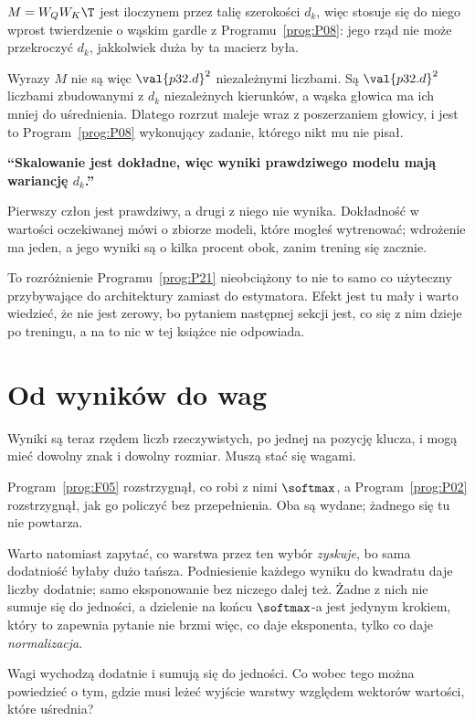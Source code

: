 \begin{fr}

$M = W_Q W_K\T$ jest iloczynem przez talię szerokości $d_k$, więc stosuje się
do niego wprost twierdzenie o wąskim gardle z Programu~\ref{prog:P08}: jego
rząd nie może przekroczyć $d_k$, jakkolwiek duża by ta macierz była.

Wyrazy $M$ nie są więc $\val{p32.d}^{2}$ niezależnymi liczbami. Są
$\val{p32.d}^{2}$ liczbami zbudowanymi z $d_k$ niezależnych kierunków, a wąska
głowica ma ich mniej do uśrednienia. Dlatego rozrzut maleje wraz z
poszerzaniem głowicy, i jest to Program~\ref{prog:P08} wykonujący zadanie,
którego nikt mu nie pisał.

\begin{trapbox}
\textbf{\enquote{Skalowanie jest dokładne, więc wyniki prawdziwego modelu
mają wariancję $d_k$.}}

Pierwszy człon jest prawdziwy, a drugi z niego nie wynika. Dokładność w
wartości oczekiwanej mówi o zbiorze modeli, które mogłeś wytrenować;
wdrożenie ma jeden, a jego wyniki są o kilka procent obok, zanim trening się
zacznie.

To rozróżnienie Programu~\ref{prog:P21} \dash{} nieobciążony to nie to samo
co użyteczny \dash{} przybywające do architektury zamiast do estymatora.
Efekt jest tu mały i warto wiedzieć, że nie jest zerowy, bo pytaniem następnej
sekcji jest, co się z nim dzieje po treningu, a na to nic w tej książce nie
odpowiada.
\end{trapbox}
\end{fr}


\section{Od wyników do wag}
\label{sec:P32-softmax}

\begin{fr}
Wyniki są teraz rzędem liczb rzeczywistych, po jednej na pozycję klucza, i
mogą mieć dowolny znak i dowolny rozmiar. Muszą stać się wagami.

Program~\ref{prog:F05} rozstrzygnął, co robi z nimi $\softmax$, a
Program~\ref{prog:P02} rozstrzygnął, jak go policzyć bez przepełnienia. Oba
są wydane; żadnego się tu nie powtarza.

Warto natomiast zapytać, co warstwa przez ten wybór \emph{zyskuje}, bo sama
dodatniość byłaby dużo tańsza. Podniesienie każdego wyniku do kwadratu daje
liczby dodatnie; samo eksponowanie bez niczego dalej też. Żadne z nich nie
sumuje się do jedności, a dzielenie na końcu $\softmax$-a jest jedynym
krokiem, który to zapewnia \dash{} pytanie nie brzmi więc, co daje
eksponenta, tylko co daje \emph{normalizacja}.

Wagi wychodzą dodatnie i sumują się do jedności. Co wobec tego można
powiedzieć o tym, gdzie musi leżeć wyjście warstwy względem wektorów
wartości, które uśrednia?
\dotline
\nextframe
\end{fr}

